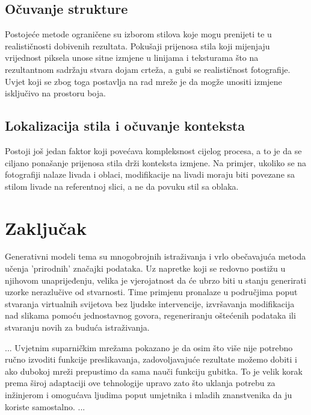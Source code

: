 \documentclass[lmodern, utf8, seminar]{fer}
\begin{document}
\section{Očuvanje strukture}
Postojeće metode ograničene su izborom stilova koje mogu prenijeti te u realističnosti dobivenih rezultata. Pokušaji prijenosa stila koji mijenjaju vrijednost piksela unose sitne izmjene u linijama i teksturama što na rezultantnom sadržaju stvara dojam crteža, a gubi se realističnost fotografije. Uvjet koji se zbog toga postavlja na rad mreže je da mogže unositi izmjene isključivo na prostoru boja.

\section{Lokalizacija stila i očuvanje konteksta} \cite{luan2017deep}
Postoji još jedan faktor koji povećava kompleksnost cijelog procesa, a to je da se ciljano ponašanje prijenosa stila drži konteksta izmjene. Na primjer, ukoliko se na fotografiji nalaze livada i oblaci, modifikacije na livadi moraju biti povezane sa stilom livade na referentnoj slici, a ne da povuku stil sa oblaka. 



\chapter{Zaključak}
Generativni modeli tema su mnogobrojnih istraživanja i vrlo obečavajuća metoda učenja 'prirodnih' značajki podataka. Uz napretke koji se redovno postižu u njihovom unaprijeđenju, velika je vjerojatnost da će ubrzo biti u stanju generirati uzorke nerazlučive od stvarnosti. Time primjenu pronalaze u područjima poput stvaranja virtualnih svijetova bez ljudske intervencije, izvršavanja modifikacija nad slikama pomoću jednostavnog govora, regeneriranju oštećenih podataka ili stvaranju novih za buduća istraživanja.
\newline

...
Uvjetnim suparničkim mrežama pokazano je da osim što više nije potrebno ručno izvoditi funkcije preslikavanja, zadovoljavajuće rezultate možemo dobiti i ako dubokoj mreži prepustimo da sama nauči funkciju gubitka. To je velik korak prema široj adaptaciji ove tehnologije upravo zato što uklanja potrebu za inžinjerom i omogućava ljudima poput umjetnika i mladih znanstvenika da ju koriste samostalno.
...
\newline



\end{document}
